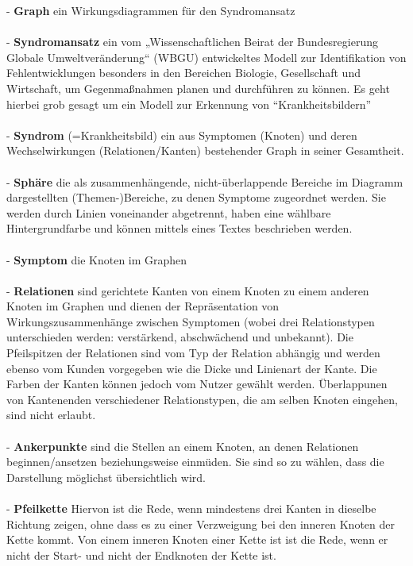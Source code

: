 \documentclass[enabledeprecatedfontcommands,fontsize=11pt,paper=a4,twoside]{scrartcl}
\newcounter{one}
\begin{document}
- \textbf{Graph} ein Wirkungsdiagrammen für den Syndromansatz  \\ \\
- \textbf{\hypertarget{Syndromansatz}{Syndromansatz}} ein vom „Wissenschaftlichen Beirat der Bundesregierung Globale Umweltveränderung“ (WBGU) entwickeltes Modell zur Identifikation von Fehlentwicklungen besonders in den Bereichen Biologie, Gesellschaft und Wirtschaft, um Gegenmaßnahmen planen und durchführen zu können. Es geht hierbei grob gesagt um ein Modell zur Erkennung von ``Krankheitsbildern'' \\ \\
- \textbf{Syndrom} (=Krankheitsbild) ein aus Symptomen (Knoten) und deren Wechselwirkungen (Relationen/Kanten) bestehender Graph in seiner Gesamtheit. \\ \\
- \textbf{\hypertarget{Sphäre}{Sphäre}} die als zusammenhängende, nicht-überlappende Bereiche im Diagramm dargestellten (Themen-)Bereiche, zu denen  Symptome zugeordnet werden. Sie werden durch Linien voneinander abgetrennt, haben eine wählbare Hintergrundfarbe und können mittels eines Textes beschrieben werden. \\ \\
- \textbf{\hypertarget{Symptom}{Symptom}} die Knoten im Graphen  \\ \\
- \textbf{Relationen} sind gerichtete Kanten von einem Knoten zu einem anderen Knoten im Graphen und dienen der Repräsentation von Wirkungszusammenhänge zwischen Symptomen (wobei drei Relationstypen unterschieden werden: verstärkend, abschwächend und unbekannt). Die Pfeilspitzen der Relationen sind vom Typ der Relation abhängig und werden ebenso vom Kunden vorgegeben wie die Dicke und Linienart der Kante. Die Farben der Kanten können jedoch vom Nutzer gewählt werden. Überlappunen von Kantenenden verschiedener Relationstypen, die am selben Knoten eingehen, sind nicht erlaubt.\\ \\
- \textbf{Ankerpunkte}  sind die Stellen an einem Knoten, an denen Relationen beginnen/ansetzen beziehungsweise einmüden. Sie sind so zu wählen, dass die Darstellung möglichst übersichtlich wird. \\ \\
- \textbf{Pfeilkette} Hiervon ist die Rede, wenn mindestens drei Kanten in dieselbe Richtung zeigen, ohne dass es zu einer Verzweigung bei den inneren Knoten der Kette kommt. Von einem inneren Knoten einer Kette ist ist die Rede, wenn er nicht der Start- und nicht der Endknoten der Kette ist. \\ \\
\end{document}
